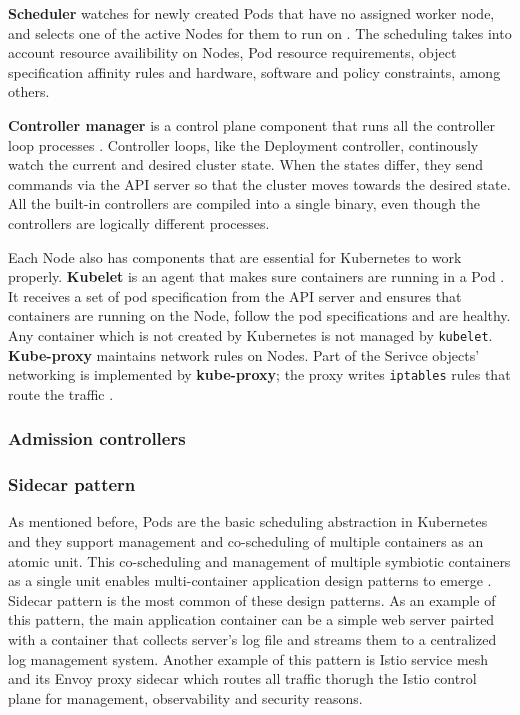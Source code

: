 \documentclass[english,12pt,a4paper,pdftex,sci,utf8]{aaltothesis}
\begin{document}
\textbf{Scheduler} watches for newly created Pods that have no assigned worker node, and selects one of the active Nodes for them to run on \cite{k8s-docs-control-plane}. The scheduling takes into account resource availibility on Nodes, Pod resource requirements, object specification affinity rules and hardware, software and policy constraints, among others.

\textbf{Controller manager} is a control plane component that runs all the controller loop processes \cite{k8s-docs-control-plane}. Controller loops, like the Deployment controller, continously watch the current and desired cluster state. When the states differ, they send commands via the API server so that the cluster moves towards the desired state. All the built-in controllers are compiled into a single binary, even though the controllers are logically different processes.

Each Node also has components that are essential for Kubernetes to work properly. \textbf{Kubelet} is an agent that makes sure containers are running in a Pod \cite{k8s-docs-control-plane}. It receives a set of pod specification from the API server and ensures that containers are running on the Node, follow the pod specifications and are healthy. Any container which is not created by Kubernetes is not managed by \texttt{kubelet}. \textbf{Kube-proxy} maintains network rules on Nodes. Part of the Serivce objects' networking is implemented by \textbf{kube-proxy}; the proxy writes \texttt{iptables} rules that route the traffic \cite{cilium-proxy-free}.

\subsubsection{Admission controllers}

\cite{k8s-docs-admission}

\subsubsection{Sidecar pattern}

As mentioned before, Pods are the basic scheduling abstraction in Kubernetes and they support management and co-scheduling of multiple containers as an atomic unit. This co-scheduling and management of multiple symbiotic containers as a single unit enables multi-container application design patterns to emerge \cite{burns2016design}. Sidecar pattern is the most common of these design patterns. As an example of this pattern, the main application container can be a simple web server pairted with a container that collects server's log file and streams them to a centralized log management system. Another example of this pattern is Istio service mesh \cite{istio} and its Envoy proxy sidecar which routes all traffic thorugh the Istio control plane for management, observability and security reasons.
\end{document}
